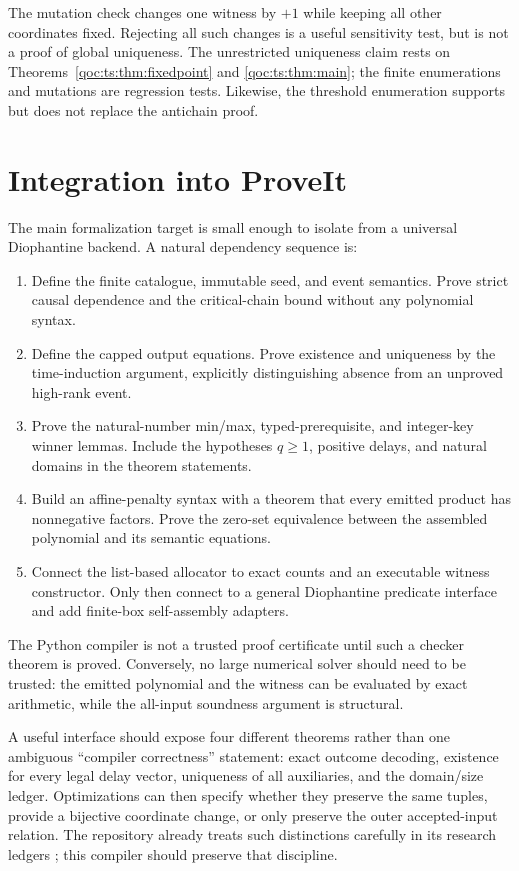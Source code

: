 \documentclass[11pt,letterpaper]{article}
\theoremstyle{definition}
\theoremstyle{remark}
\begin{document}
The mutation check changes one witness by $+1$ while keeping all other
coordinates fixed. Rejecting all such changes is a useful sensitivity
test, but is not a proof of global uniqueness. The unrestricted uniqueness
claim rests on Theorems~\ref{qoc:ts:thm:fixedpoint} and \ref{qoc:ts:thm:main}; the
finite enumerations and mutations are regression tests. Likewise, the
threshold enumeration supports but does not replace the antichain proof.

\section{Integration into ProveIt}
The main formalization target is small enough to isolate from a universal
Diophantine backend. A natural dependency sequence is:
\begin{enumerate}[label=\arabic*.]
\item Define the finite catalogue, immutable seed, and event semantics.
Prove strict causal dependence and the critical-chain bound without any
polynomial syntax.
\item Define the capped output equations. Prove existence and uniqueness
by the time-induction argument, explicitly distinguishing absence from
an unproved high-rank event.
\item Prove the natural-number min/max, typed-prerequisite, and integer-key
winner lemmas. Include the hypotheses $q\ge1$, positive delays, and
natural domains in the theorem statements.
\item Build an affine-penalty syntax with a theorem that every emitted
product has nonnegative factors. Prove the zero-set equivalence between
the assembled polynomial and its semantic equations.
\item Connect the list-based allocator to exact counts and an executable
witness constructor. Only then connect to a general Diophantine predicate
interface and add finite-box self-assembly adapters.
\end{enumerate}
The Python compiler is not a trusted proof certificate until such a
checker theorem is proved. Conversely, no large numerical solver should
need to be trusted: the emitted polynomial and the witness can be evaluated
by exact arithmetic, while the all-input soundness argument is structural.

A useful interface should expose four different theorems rather than one
ambiguous ``compiler correctness'' statement: exact outcome decoding,
existence for every legal delay vector, uniqueness of all auxiliaries,
and the domain/size ledger. Optimizations can then specify whether they
preserve the same tuples, provide a bijective coordinate change, or only
preserve the outer accepted-input relation. The repository already treats
such distinctions carefully in its research ledgers
\cite{ts:repo-h10,ts:repo-native}; this compiler should preserve that discipline.
\end{document}
